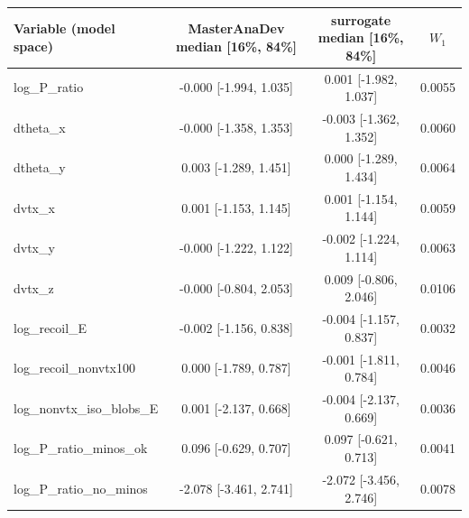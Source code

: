 \begin{tabular}{lccc}
\toprule
Variable (model space) & MasterAnaDev median [16\%, 84\%] & surrogate median [16\%, 84\%] & $W_1$ \\
\midrule
log\_P\_ratio & -0.000 [-1.994, 1.035] & 0.001 [-1.982, 1.037] & 0.0055 \\
dtheta\_x & -0.000 [-1.358, 1.353] & -0.003 [-1.362, 1.352] & 0.0060 \\
dtheta\_y & 0.003 [-1.289, 1.451] & 0.000 [-1.289, 1.434] & 0.0064 \\
dvtx\_x & 0.001 [-1.153, 1.145] & 0.001 [-1.154, 1.144] & 0.0059 \\
dvtx\_y & -0.000 [-1.222, 1.122] & -0.002 [-1.224, 1.114] & 0.0063 \\
dvtx\_z & -0.000 [-0.804, 2.053] & 0.009 [-0.806, 2.046] & 0.0106 \\
log\_recoil\_E & -0.002 [-1.156, 0.838] & -0.004 [-1.157, 0.837] & 0.0032 \\
log\_recoil\_nonvtx100 & 0.000 [-1.789, 0.787] & -0.001 [-1.811, 0.784] & 0.0046 \\
log\_nonvtx\_iso\_blobs\_E & 0.001 [-2.137, 0.668] & -0.004 [-2.137, 0.669] & 0.0036 \\
log\_P\_ratio\_minos\_ok & 0.096 [-0.629, 0.707] & 0.097 [-0.621, 0.713] & 0.0041 \\
log\_P\_ratio\_no\_minos & -2.078 [-3.461, 2.741] & -2.072 [-3.456, 2.746] & 0.0078 \\
\bottomrule
\end{tabular}
